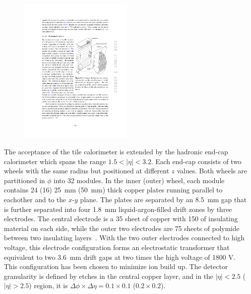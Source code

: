 \begin{figure}[ht]
    \centering
    \includegraphics[width=0.5\textwidth]{fig/detector/tile_module.pdf}
    \caption[]{}
\label{chap:detector:fig:tile_module}
\end{figure}

The acceptance of the tile calorimeter is extended by the hadronic
end-cap calorimeter which spans the range $1.5 < |\eta| < 3.2$. Each
end-cap consists of two wheels with the same radius but positioned at
different $z$ values. Both wheels are partitioned in $\phi$ into 32
modules. In the inner (outer) wheel, each module contains 24 (16)
25~mm (50~mm) thick copper plates running parallel to eachother and to the
$x$-$y$ plane. The plates are separated by an 8.5~mm gap that is
further separated into four 1.8~mm liquid-argon-filled drift zones by
three electrodes. The central electrode is a 35 \micron sheet of
copper with 150 \micron of insulating material on each side, while the
outer two electrodes are 75 \micron sheets of polymide between two
insulating layers~\cite{bib:Gingrich:2007ia}. With the two outer
electrodes connected to high voltage, this electrode configuration
forms an electrostatic transformer that equivalent to two 3.6~mm drift
gaps at two times the high voltage of 1800 V. This configuration has
been chosen to minimize ion build up. The detector granularity is
defined by etches in the central copper layer, and in the $|\eta| <
2.5$ ($|\eta| > 2.5$) region, it is $\Delta\phi \times \Delta\eta =
0.1 \times 0.1$ ($0.2 \times 0.2$). 

